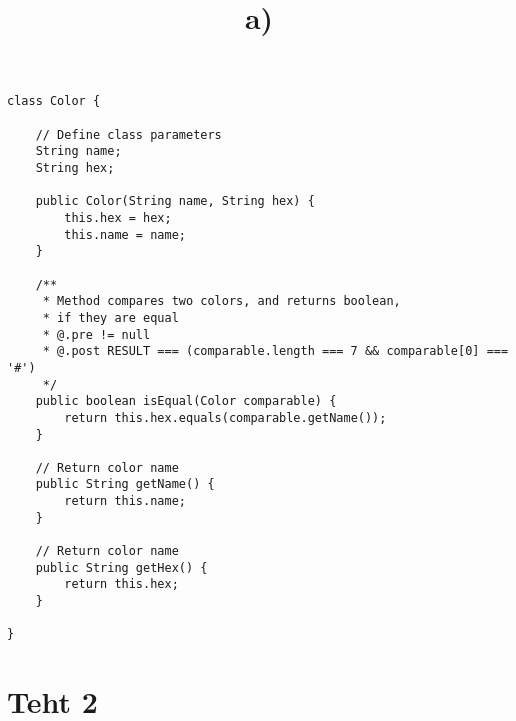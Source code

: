 \documentclass[a4paper,12pt,titlepage]{article}
\theoremstyle{definition}
\theoremstyle{remark}
\begin{document}
\begin{lstlisting}
class Color {

    // Define class parameters
    String name;
    String hex;

    public Color(String name, String hex) {
        this.hex = hex;
        this.name = name;
    }

    /**
     * Method compares two colors, and returns boolean,
     * if they are equal
     * @.pre != null
     * @.post RESULT === (comparable.length === 7 && comparable[0] === '#')
     */
    public boolean isEqual(Color comparable) {
        return this.hex.equals(comparable.getName());
    }

    // Return color name
    public String getName() {
        return this.name;
    }

    // Return color name
    public String getHex() {
        return this.hex;
    }

}

\end{lstlisting}

\newpage
\section{Teht 2}
\title{a)}
\end{document}
